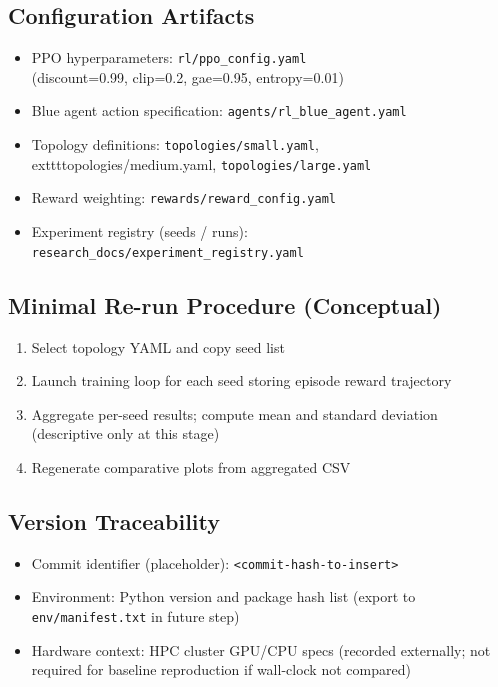 \documentclass[12pt,oneside]{article}
\begin{document}
\subsection{Configuration Artifacts}
\begin{itemize}
    \item PPO hyperparameters: \texttt{rl/ppo\_config.yaml} \\
          (discount=0.99, clip=0.2, gae=0.95, entropy=0.01)
    \item Blue agent action specification: \texttt{agents/rl\_blue\_agent.yaml}
    \item Topology definitions: \texttt{topologies/small.yaml}, \\
          	exttt{topologies/medium.yaml}, \texttt{topologies/large.yaml}
    \item Reward weighting: \texttt{rewards/reward\_config.yaml}
    \item Experiment registry (seeds / runs): \texttt{research\_docs/experiment\_registry.yaml}
\end{itemize}

\subsection{Minimal Re-run Procedure (Conceptual)}
\begin{enumerate}
    \item Select topology YAML and copy seed list
    \item Launch training loop for each seed storing episode reward trajectory
    \item Aggregate per-seed results; compute mean and standard deviation (descriptive only at this stage)
    \item Regenerate comparative plots from aggregated CSV
\end{enumerate}

\subsection{Version Traceability}
\begin{itemize}
    \item Commit identifier (placeholder): \texttt{<commit-hash-to-insert>}
    \item Environment: Python version and package hash list (export to \texttt{env/manifest.txt} in future step)
    \item Hardware context: HPC cluster GPU/CPU specs (recorded externally; not required for baseline reproduction if wall-clock not compared)
\end{itemize}
\end{document}
